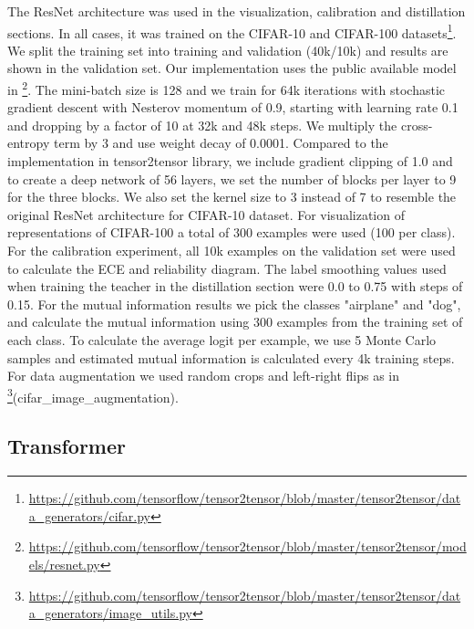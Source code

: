 \documentclass{article}
\begin{document}
The ResNet architecture was used in the visualization, calibration and distillation sections.  In all cases, it was trained on the CIFAR-10 and CIFAR-100 datasets\footnote{\scriptsize\url{https://github.com/tensorflow/tensor2tensor/blob/master/tensor2tensor/data_generators/cifar.py}}. We split the training set into training and validation (40k/10k) and results are shown in the validation set. Our implementation uses the public available model in \footnote{\scriptsize\url{https://github.com/tensorflow/tensor2tensor/blob/master/tensor2tensor/models/resnet.py}}.  
The mini-batch size is 128 and we train for 64k iterations with stochastic gradient descent with Nesterov momentum of 0.9, starting with learning rate 0.1 and dropping by a factor of 10 at 32k and 48k steps. We multiply the cross-entropy term by 3 and use weight decay of 0.0001. Compared to the implementation in tensor2tensor library, we include gradient clipping of 1.0 and to create a deep network of 56 layers, we set the number of blocks per layer to 9 for the three blocks. We also set the kernel size to 3 instead of 7 to resemble the original ResNet architecture for CIFAR-10 dataset. For visualization of representations of CIFAR-100 a total of 300 examples were used (100 per class). For the calibration experiment, all 10k examples on the validation set were used to calculate the ECE and reliability diagram. The label smoothing values used when training the teacher in the distillation section were 0.0 to 0.75 with steps of 0.15. For the mutual information results we pick the classes "airplane" and "dog", and calculate the mutual information using 300 examples from the training set of each class. To calculate the average logit per example, we use 5 Monte Carlo samples and estimated mutual information is calculated every 4k training steps. For data augmentation we used random crops and left-right flips as in \footnote{\scriptsize\url{https://github.com/tensorflow/tensor2tensor/blob/master/tensor2tensor/data_generators/image_utils.py}}(cifar\_image\_augmentation).  

\subsection{Transformer}
\end{document}
